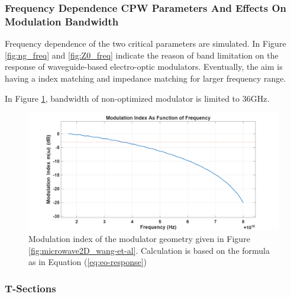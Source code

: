 \subsubsection{Frequency Dependence CPW Parameters And Effects On Modulation Bandwidth}
    
	Frequency dependence of the two critical parameters are simulated. In Figure \ref{fig:ng_freq} and \ref{fig:Z0_freq} indicate the reason of band limitation on the response of waveguide-based electro-optic modulators. Eventually, the aim is having a index matching and impedance matching for larger frequency range. 
	
	
	In Figure \ref{fig:modulation_index_1}, bandwidth of non-optimized modulator is limited to 36GHz. 
    
	\begin{figure}[h!]
		\centering
        \includegraphics[width=0.9\linewidth]{modulation_index_vs_freq_15-80ghz_1ghz_step.png}
        \caption{Modulation index of the modulator geometry given in Figure \ref{fig:microwave2D_wang-et-al}. Calculation is based on the formula as in Equation (\ref{eq:eo-response})}
        \label{fig:modulation_index_1}
	\end{figure}	    
    
\subsubsection{T-Sections}
  	

   
    
    